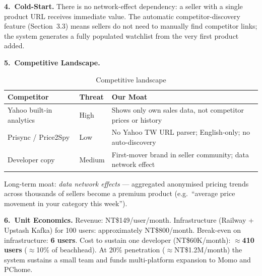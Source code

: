 \documentclass[11pt,a4paper]{article}
\begin{document}
\textbf{4.\ Cold-Start.}
There is no network-effect dependency: a seller with a single product URL receives
immediate value. The automatic competitor-discovery feature (Section~3.3) means
sellers do not need to manually find competitor links; the system generates a
fully populated watchlist from the very first product added.

\textbf{5.\ Competitive Landscape.}

\begin{table}[H]
\centering\small\renewcommand{\arraystretch}{1.2}
\begin{tabularx}{\textwidth}{L{3.8cm} C{2.2cm} X}
\toprule
\textbf{Competitor} & \textbf{Threat} & \textbf{Our Moat} \\
\midrule
Yahoo built-in analytics & High & Shows only own sales data, not competitor prices or history \\
Prisync / Price2Spy      & Low  & No Yahoo TW URL parser; English-only; no auto-discovery \\
Developer copy           & Medium & First-mover brand in seller community; data network effect \\
\bottomrule
\end{tabularx}
\caption{Competitive landscape}
\end{table}

Long-term moat: \emph{data network effects} --- aggregated anonymised pricing
trends across thousands of sellers become a premium product
(e.g.\ ``average price movement in your category this week'').

\textbf{6.\ Unit Economics.}
Revenue: NT\$149/user/month.
Infrastructure (Railway + Upstash Kafka) for 100 users: approximately NT\$800/month.
Break-even on infrastructure: \textbf{6 users}.
Cost to sustain one developer (NT\$60K/month): \textbf{$\approx$410 users} ($\approx$10\% of beachhead).
At 20\% penetration ($\approx$NT\$1.2M/month) the system sustains a small team
and funds multi-platform expansion to Momo and PChome.
\end{document}
